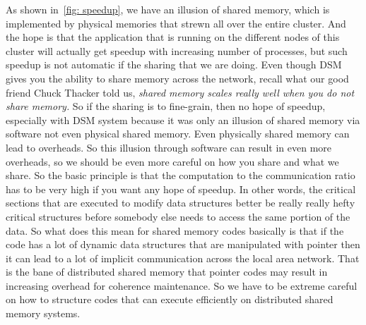 \documentclass[11pt]{lecture}
\begin{document}
As shown in~\autoref{fig: speedup}, we have an illusion of shared memory, which is implemented by physical memories 
that strewn all over the entire cluster. And the hope is that the application that is running on 
the different nodes of this cluster will actually get speedup with increasing number of 
processes, but such speedup is not automatic if the sharing that we are doing. Even though 
DSM gives you the ability to share memory across the network, recall what our good friend Chuck 
Thacker told us, {\it shared memory scales really well when you do not share memory.} So if the sharing is 
to fine-grain, then no hope of speedup, especially with DSM system because it was only an illusion of 
shared memory via software not even physical shared memory. Even physically shared memory can lead to 
overheads. So this illusion through software can result in even more overheads, so we should 
be even more careful on how you share and what we share. So the basic principle is that the computation to the 
communication ratio has to be very high if you want any hope of speedup. In other words, 
the critical sections that are executed to modify data structures better be really really 
hefty critical structures before somebody else needs to access the same portion of the data. 
So what does this mean for shared memory codes basically is that if the code has a lot of 
dynamic data structures that are manipulated with pointer then it can lead to a lot of implicit 
communication across the local area network. That is the bane of distributed shared memory that 
pointer codes may result in increasing overhead for coherence maintenance. So we have to be 
extreme careful on how to structure codes that can execute efficiently on distributed shared memory systems. 






\end{document}
